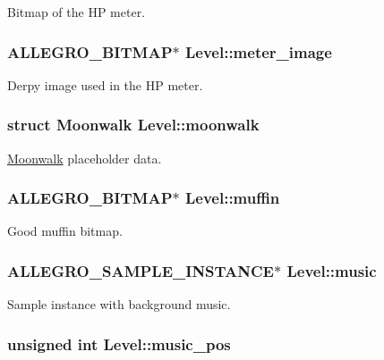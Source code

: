 \-Bitmap of the \-H\-P meter. \hypertarget{structLevel_a371c97dfa3d564a19648cb1b72edbf60}{
\subsubsection[{meter\-\_\-image}]{\setlength{\rightskip}{0pt plus 5cm}\-A\-L\-L\-E\-G\-R\-O\-\_\-\-B\-I\-T\-M\-A\-P$\ast$ {\bf \-Level\-::meter\-\_\-image}}}\label{structLevel_a371c97dfa3d564a19648cb1b72edbf60}
\-Derpy image used in the \-H\-P meter. \hypertarget{structLevel_ab9e39b9ac0f342332e034c59d55d6a07}{
\subsubsection[{moonwalk}]{\setlength{\rightskip}{0pt plus 5cm}struct {\bf \-Moonwalk} {\bf \-Level\-::moonwalk}}}\label{structLevel_ab9e39b9ac0f342332e034c59d55d6a07}
\hyperlink{structMoonwalk}{\-Moonwalk} placeholder data. \hypertarget{structLevel_ad4d4190d232b674d4211f3355a9b7a93}{
\subsubsection[{muffin}]{\setlength{\rightskip}{0pt plus 5cm}\-A\-L\-L\-E\-G\-R\-O\-\_\-\-B\-I\-T\-M\-A\-P$\ast$ {\bf \-Level\-::muffin}}}\label{structLevel_ad4d4190d232b674d4211f3355a9b7a93}
\-Good muffin bitmap. \hypertarget{structLevel_a41c6aae8f508e078b02c291e1d6f8e67}{
\subsubsection[{music}]{\setlength{\rightskip}{0pt plus 5cm}\-A\-L\-L\-E\-G\-R\-O\-\_\-\-S\-A\-M\-P\-L\-E\-\_\-\-I\-N\-S\-T\-A\-N\-C\-E$\ast$ {\bf \-Level\-::music}}}\label{structLevel_a41c6aae8f508e078b02c291e1d6f8e67}
\-Sample instance with background music. \hypertarget{structLevel_a13e322deb3298846260af31324e5b492}{
\subsubsection[{music\-\_\-pos}]{\setlength{\rightskip}{0pt plus 5cm}unsigned int {\bf \-Level\-::music\-\_\-pos}}}\label{structLevel_a13e322deb3298846260af31324e5b492}
